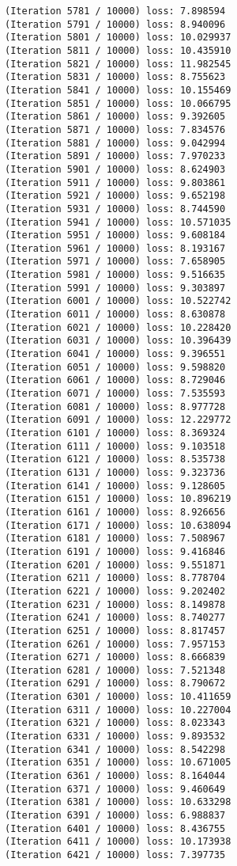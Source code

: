 \documentclass[11pt]{article}
\begin{document}
\begin{Verbatim}[commandchars=\\\{\}]
(Iteration 5781 / 10000) loss: 7.898594
(Iteration 5791 / 10000) loss: 8.940096
(Iteration 5801 / 10000) loss: 10.029937
(Iteration 5811 / 10000) loss: 10.435910
(Iteration 5821 / 10000) loss: 11.982545
(Iteration 5831 / 10000) loss: 8.755623
(Iteration 5841 / 10000) loss: 10.155469
(Iteration 5851 / 10000) loss: 10.066795
(Iteration 5861 / 10000) loss: 9.392605
(Iteration 5871 / 10000) loss: 7.834576
(Iteration 5881 / 10000) loss: 9.042994
(Iteration 5891 / 10000) loss: 7.970233
(Iteration 5901 / 10000) loss: 8.624903
(Iteration 5911 / 10000) loss: 9.803861
(Iteration 5921 / 10000) loss: 9.652198
(Iteration 5931 / 10000) loss: 8.744590
(Iteration 5941 / 10000) loss: 10.571035
(Iteration 5951 / 10000) loss: 9.608184
(Iteration 5961 / 10000) loss: 8.193167
(Iteration 5971 / 10000) loss: 7.658905
(Iteration 5981 / 10000) loss: 9.516635
(Iteration 5991 / 10000) loss: 9.303897
(Iteration 6001 / 10000) loss: 10.522742
(Iteration 6011 / 10000) loss: 8.630878
(Iteration 6021 / 10000) loss: 10.228420
(Iteration 6031 / 10000) loss: 10.396439
(Iteration 6041 / 10000) loss: 9.396551
(Iteration 6051 / 10000) loss: 9.598820
(Iteration 6061 / 10000) loss: 8.729046
(Iteration 6071 / 10000) loss: 7.535593
(Iteration 6081 / 10000) loss: 8.977728
(Iteration 6091 / 10000) loss: 12.229772
(Iteration 6101 / 10000) loss: 8.369324
(Iteration 6111 / 10000) loss: 9.103518
(Iteration 6121 / 10000) loss: 8.535738
(Iteration 6131 / 10000) loss: 9.323736
(Iteration 6141 / 10000) loss: 9.128605
(Iteration 6151 / 10000) loss: 10.896219
(Iteration 6161 / 10000) loss: 8.926656
(Iteration 6171 / 10000) loss: 10.638094
(Iteration 6181 / 10000) loss: 7.508967
(Iteration 6191 / 10000) loss: 9.416846
(Iteration 6201 / 10000) loss: 9.551871
(Iteration 6211 / 10000) loss: 8.778704
(Iteration 6221 / 10000) loss: 9.202402
(Iteration 6231 / 10000) loss: 8.149878
(Iteration 6241 / 10000) loss: 8.740277
(Iteration 6251 / 10000) loss: 8.817457
(Iteration 6261 / 10000) loss: 7.957153
(Iteration 6271 / 10000) loss: 8.666839
(Iteration 6281 / 10000) loss: 7.521348
(Iteration 6291 / 10000) loss: 8.790672
(Iteration 6301 / 10000) loss: 10.411659
(Iteration 6311 / 10000) loss: 10.227004
(Iteration 6321 / 10000) loss: 8.023343
(Iteration 6331 / 10000) loss: 9.893532
(Iteration 6341 / 10000) loss: 8.542298
(Iteration 6351 / 10000) loss: 10.671005
(Iteration 6361 / 10000) loss: 8.164044
(Iteration 6371 / 10000) loss: 9.460649
(Iteration 6381 / 10000) loss: 10.633298
(Iteration 6391 / 10000) loss: 6.988837
(Iteration 6401 / 10000) loss: 8.436755
(Iteration 6411 / 10000) loss: 10.173938
(Iteration 6421 / 10000) loss: 7.397735

\end{Verbatim}
\end{document}
